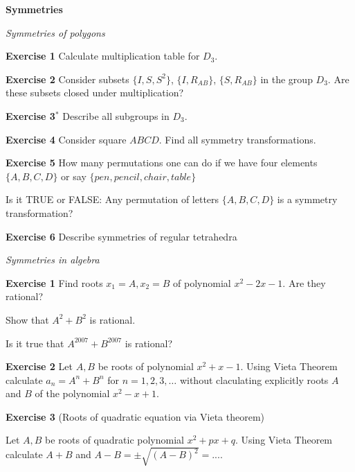 

  \centerline {\bf Symmetries}


\bigskip

{\it Symmetries of polygons}
\medskip


{\bf Exercise 1} Calculate multiplication table for $D_3$.



\medskip

 {\bf Exercise 2}  Consider subsets $\{I, S,S^2\}$, $\{I,R_{AB}\}$, $\{S, R_{AB}\}$ in the group $D_3$.
 Are these subsets closed under multiplication?



\medskip

 {\bf Exercise 3$^*$} Describe all subgroups in $D_3$.




\medskip

{\bf Exercise 4}  Consider square  $ABCD$. Find all
symmetry transformations.

 \medskip

   {\bf Exercise 5} How many permutations one can do if we have four elements $\{A,B,C,D\}$ or say
     $\{pen, pencil, chair, table\}$


\medskip

  Is it TRUE or FALSE:  Any permutation of letters $\{A,B,C,D\}$ is a symmetry transformation?

\medskip

 {\bf Exercise 6} Describe symmetries of regular tetrahedra


 \bigskip
{\it Symmetries in algebra}

\medskip

  {\bf Exercise 1}
    Find roots $x_1=A,x_2=B$ of polynomial $x^2-2x-1$.  Are they rational?

    Show that $A^2+B^2$ is rational.

    Is it true that $A^{2007}+B^{2007}$ is rational?

\medskip


    {\bf Exercise 2} Let $A,B$ be roots of polynomial $x^2+x-1$.
     Using Vieta Theorem calculate $a_n=A^n+B^n$ for $n=1,2,3,\dots$ without claculating explicitly roots $A$ and $B$ of the polynomial
    $x^2-x+1$.

\medskip



    {\bf Exercise 3} (Roots of quadratic equation via Vieta theorem)

     Let $A, B$ be roots of quadratic polynomial $x^2+px+q$.
  Using Vieta Theorem calculate $A+B$ and $A-B=\pm \sqrt {(A-B)^2}=....$

